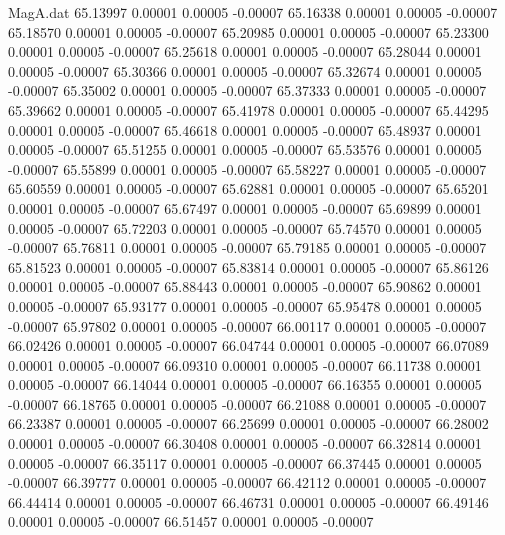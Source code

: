 \begin{filecontents}{MagA.dat}
  65.13997    0.00001    0.00005   -0.00007
  65.16338    0.00001    0.00005   -0.00007
  65.18570    0.00001    0.00005   -0.00007
  65.20985    0.00001    0.00005   -0.00007
  65.23300    0.00001    0.00005   -0.00007
  65.25618    0.00001    0.00005   -0.00007
  65.28044    0.00001    0.00005   -0.00007
  65.30366    0.00001    0.00005   -0.00007
  65.32674    0.00001    0.00005   -0.00007
  65.35002    0.00001    0.00005   -0.00007
  65.37333    0.00001    0.00005   -0.00007
  65.39662    0.00001    0.00005   -0.00007
  65.41978    0.00001    0.00005   -0.00007
  65.44295    0.00001    0.00005   -0.00007
  65.46618    0.00001    0.00005   -0.00007
  65.48937    0.00001    0.00005   -0.00007
  65.51255    0.00001    0.00005   -0.00007
  65.53576    0.00001    0.00005   -0.00007
  65.55899    0.00001    0.00005   -0.00007
  65.58227    0.00001    0.00005   -0.00007
  65.60559    0.00001    0.00005   -0.00007
  65.62881    0.00001    0.00005   -0.00007
  65.65201    0.00001    0.00005   -0.00007
  65.67497    0.00001    0.00005   -0.00007
  65.69899    0.00001    0.00005   -0.00007
  65.72203    0.00001    0.00005   -0.00007
  65.74570    0.00001    0.00005   -0.00007
  65.76811    0.00001    0.00005   -0.00007
  65.79185    0.00001    0.00005   -0.00007
  65.81523    0.00001    0.00005   -0.00007
  65.83814    0.00001    0.00005   -0.00007
  65.86126    0.00001    0.00005   -0.00007
  65.88443    0.00001    0.00005   -0.00007
  65.90862    0.00001    0.00005   -0.00007
  65.93177    0.00001    0.00005   -0.00007
  65.95478    0.00001    0.00005   -0.00007
  65.97802    0.00001    0.00005   -0.00007
  66.00117    0.00001    0.00005   -0.00007
  66.02426    0.00001    0.00005   -0.00007
  66.04744    0.00001    0.00005   -0.00007
  66.07089    0.00001    0.00005   -0.00007
  66.09310    0.00001    0.00005   -0.00007
  66.11738    0.00001    0.00005   -0.00007
  66.14044    0.00001    0.00005   -0.00007
  66.16355    0.00001    0.00005   -0.00007
  66.18765    0.00001    0.00005   -0.00007
  66.21088    0.00001    0.00005   -0.00007
  66.23387    0.00001    0.00005   -0.00007
  66.25699    0.00001    0.00005   -0.00007
  66.28002    0.00001    0.00005   -0.00007
  66.30408    0.00001    0.00005   -0.00007
  66.32814    0.00001    0.00005   -0.00007
  66.35117    0.00001    0.00005   -0.00007
  66.37445    0.00001    0.00005   -0.00007
  66.39777    0.00001    0.00005   -0.00007
  66.42112    0.00001    0.00005   -0.00007
  66.44414    0.00001    0.00005   -0.00007
  66.46731    0.00001    0.00005   -0.00007
  66.49146    0.00001    0.00005   -0.00007
  66.51457    0.00001    0.00005   -0.00007

\end{filecontents}
